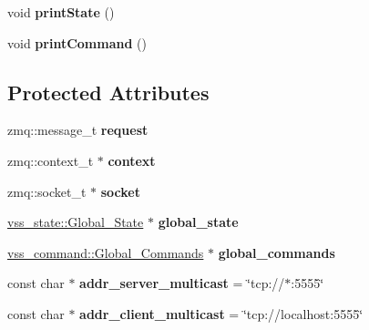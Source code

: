 \begin{DoxyCompactItemize}
\item 
\hypertarget{classInterface_ab8f9122465d78b9e41bfde9ea560a657}{void {\bfseries print\-State} ()}\label{classInterface_ab8f9122465d78b9e41bfde9ea560a657}

\item 
\hypertarget{classInterface_aaa4e713b2b72649d5253c83bf9e2416a}{void {\bfseries print\-Command} ()}\label{classInterface_aaa4e713b2b72649d5253c83bf9e2416a}

\end{DoxyCompactItemize}
\subsection*{Protected Attributes}
\begin{DoxyCompactItemize}
\item 
\hypertarget{classInterface_a99822a3bea1a0cb8c72670db0f797689}{zmq\-::message\-\_\-t {\bfseries request}}\label{classInterface_a99822a3bea1a0cb8c72670db0f797689}

\item 
\hypertarget{classInterface_a7a2bda6046550893e9454930636e76d5}{zmq\-::context\-\_\-t $\ast$ {\bfseries context}}\label{classInterface_a7a2bda6046550893e9454930636e76d5}

\item 
\hypertarget{classInterface_af38139f534f08df8b3dc9f29001e9584}{zmq\-::socket\-\_\-t $\ast$ {\bfseries socket}}\label{classInterface_af38139f534f08df8b3dc9f29001e9584}

\item 
\hypertarget{classInterface_ac488bcc6708103cb36d132c895efa7a0}{\hyperlink{classvss__state_1_1Global__State}{vss\-\_\-state\-::\-Global\-\_\-\-State} $\ast$ {\bfseries global\-\_\-state}}\label{classInterface_ac488bcc6708103cb36d132c895efa7a0}

\item 
\hypertarget{classInterface_a0109a54da68b3e7cd0c652f6cdd75abe}{\hyperlink{classvss__command_1_1Global__Commands}{vss\-\_\-command\-::\-Global\-\_\-\-Commands} $\ast$ {\bfseries global\-\_\-commands}}\label{classInterface_a0109a54da68b3e7cd0c652f6cdd75abe}

\item 
\hypertarget{classInterface_a13af5d0710e73dc30603c7fd13e763c9}{const char $\ast$ {\bfseries addr\-\_\-server\-\_\-multicast} = \char`\"{}tcp\-://$\ast$\-:5555\char`\"{}}\label{classInterface_a13af5d0710e73dc30603c7fd13e763c9}

\item 
\hypertarget{classInterface_a8215c1845687c3bceb55d2ab21f7f1ff}{const char $\ast$ {\bfseries addr\-\_\-client\-\_\-multicast} = \char`\"{}tcp\-://localhost\-:5555\char`\"{}}\label{classInterface_a8215c1845687c3bceb55d2ab21f7f1ff}


\end{DoxyCompactItemize}
